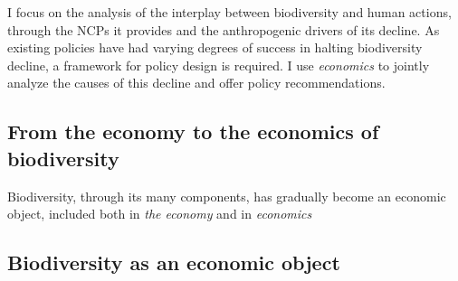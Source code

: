 I focus on the analysis of the interplay between biodiversity and human actions, through the NCPs it provides and the anthropogenic drivers of its decline. As existing policies have had varying degrees of success in halting biodiversity decline, a framework for policy design is required. I use \textit{economics} to jointly analyze the causes of this decline and offer policy recommendations. 

\subsection*{From the economy to the economics of biodiversity}

Biodiversity, through its many components, has gradually become an economic object, included both in \textit{the economy} and in \textit{economics}

\subsection*{Biodiversity as an economic object}

